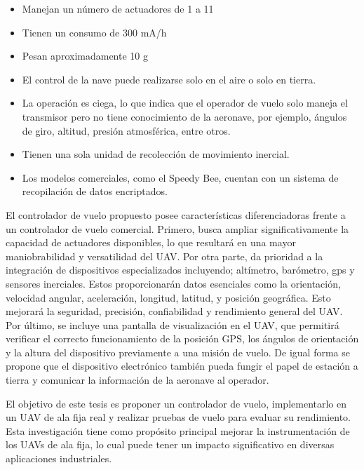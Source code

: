 \begin{itemize}
    \item Manejan un número de actuadores de 1 a 11
    \item Tienen un consumo de 300 mA/h
    \item Pesan aproximadamente 10 g
    \item El control de la nave puede realizarse solo en el aire o solo en tierra.
    \item La operación es ciega, lo que indica que el operador de vuelo solo maneja el transmisor pero no tiene conocimiento de la aeronave, por ejemplo, ángulos de giro, altitud, presión atmosférica, entre otros.
    \item Tienen una sola unidad de recolección de movimiento inercial.
    \item Los modelos comerciales, como el Speedy Bee, cuentan con un sistema de recopilación de datos encriptados.
\end{itemize}


\vspace{5 px}
El controlador de vuelo propuesto posee características diferenciadoras frente a un controlador de vuelo comercial. Primero, busca ampliar significativamente la capacidad de actuadores disponibles, lo que resultará en una mayor maniobrabilidad y versatilidad del UAV. Por otra parte, da prioridad a la integración de dispositivos especializados incluyendo; altímetro, barómetro, gps y sensores inerciales. Estos proporcionarán datos esenciales como la orientación, velocidad angular, aceleración, longitud, latitud,  y posición geográfica. Esto mejorará la seguridad, precisión, confiabilidad y rendimiento general del UAV. Por último, se incluye una pantalla de visualización en el UAV, que permitirá verificar el correcto funcionamiento de la posición GPS, los ángulos de orientación y la altura del dispositivo previamente a una misión de vuelo. De igual forma se propone que el dispositivo electrónico también pueda fungir el papel de estación a tierra y comunicar la información de la aeronave al operador. \vspace{5px}

El objetivo de este tesis es proponer un controlador de vuelo, implementarlo en un UAV de ala fija real y realizar pruebas de vuelo para evaluar su rendimiento. Esta investigación tiene como propósito principal mejorar la instrumentación de los UAVs de ala fija, lo cual puede tener un impacto significativo en diversas aplicaciones industriales.\vspace{5px}

